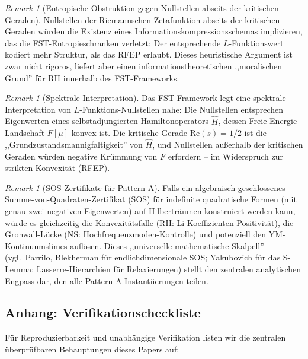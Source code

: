 \documentclass[12pt,a4paper]{article}
\theoremstyle{definition}
\theoremstyle{remark}
\newtheorem{remark}[theorem]{Remark}
\begin{document}
\begin{remark}[Entropische Obstruktion gegen Nullstellen abseits der kritischen Geraden]
\label{rem:entropic-obstruction}
Nullstellen der Riemannschen Zetafunktion abseits der kritischen Geraden würden die Existenz eines Informationskompressionsschemas implizieren, das die FST-Entropieschranken verletzt: Der entsprechende $L$-Funktionswert kodiert mehr Struktur, als das RFEP erlaubt. Dieses heuristische Argument ist zwar nicht rigoros, liefert aber einen informationstheoretischen ,,moralischen Grund'' für RH innerhalb des FST-Frameworks.
\end{remark}

\begin{remark}[Spektrale Interpretation]
\label{rem:spectral-interpretation}
Das FST-Framework legt eine spektrale Interpretation von $L$-Funktions-Nullstellen nahe: Die Nullstellen entsprechen Eigenwerten eines selbstadjungierten Hamiltonoperators $\hat{H}$, dessen Freie-Energie-Landschaft $F[\mu]$ konvex ist. Die kritische Gerade $\mathrm{Re}(s) = 1/2$ ist die ,,Grundzustandsmannigfaltigkeit'' von $\hat{H}$, und Nullstellen außerhalb der kritischen Geraden würden negative Krümmung von $F$ erfordern -- im Widerspruch zur strikten Konvexität (RFEP).
\end{remark}

\begin{remark}[SOS-Zertifikate für Pattern A]
\label{rem:sos-certificate}
Falls ein algebraisch geschlossenes Summe-von-Quadraten-Zertifikat (SOS) für indefinite quadratische Formen (mit genau zwei negativen Eigenwerten) auf Hilberträumen konstruiert werden kann, würde es gleichzeitig die Konvexitätsfalle (RH: Li-Koeffizienten-Positivität), die Gronwall-Lücke (NS: Hochfrequenzmoden-Kontrolle) und potenziell den YM-Kontinuumslimes auflösen. Dieses ,,universelle mathematische Skalpell'' (vgl.\ Parrilo, Blekherman für endlichdimensionale SOS; Yakubovich für das S-Lemma; Lasserre-Hierarchien für Relaxierungen) stellt den zentralen analytischen Engpass dar, den alle Pattern-A-Instantiierungen teilen.
\end{remark}

\subsection*{Anhang: Verifikationscheckliste}
\label{app:verification}

Für Reproduzierbarkeit und unabhängige Verifikation listen wir die zentralen überprüfbaren Behauptungen dieses Papers auf:
\end{document}
